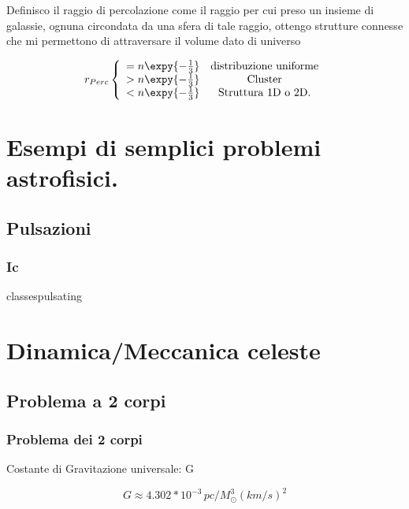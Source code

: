 \documentclass[oneside,12pt,fleqn]{memoir}
\begin{document}
Definisco il raggio di percolazione come il raggio per cui preso un insieme di galassie, ognuna circondata da una sfera di tale raggio, ottengo strutture connesse che mi permettono di attraversare il volume dato di universo

\begin{equation*}
    r_{Perc}\left\{\begin{array}{cc}
                =n\expy{-\frac{1}{3}}&\text{distribuzione uniforme}\\
                >n\expy{-\frac{1}{3}}&\text{Cluster}\\
                <n\expy{-\frac{1}{3}}&\text{Struttura 1D o 2D.}\\
    \end{array}\right.
\end{equation*}

\clearpage

\part{Esempi di semplici problemi astrofisici.}

\chapter{Pulsazioni}
\PartialToc

\section{Ic}

classespulsating

\part{Dinamica/Meccanica celeste}

\chapter{Problema a 2 corpi}
\PartialToc

\section{Problema dei 2 corpi}



\begin{usefull}{Costante di Gravitazione universale: G}

\begin{equation*}
G\approx4.302*10^{-3}\,pc/M_{\odot}^{3}(km/s)^2
\end{equation*}

\end{usefull}
\end{document}
